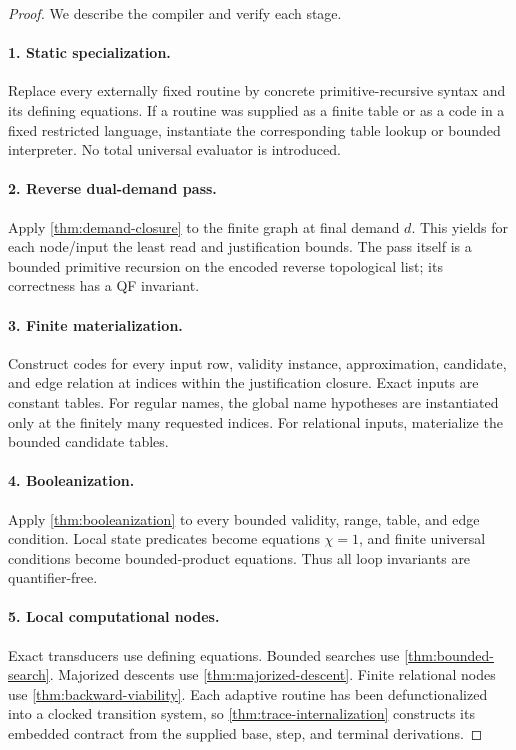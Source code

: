 \begin{proof}
We describe the compiler and verify each stage.

\paragraph{1. Static specialization.}
Replace every externally fixed routine by concrete primitive-recursive syntax and its
defining equations.  If a routine was supplied as a finite table or as a code in a
fixed restricted language, instantiate the corresponding table lookup or bounded
interpreter.  No total universal evaluator is introduced.

\paragraph{2. Reverse dual-demand pass.}
Apply \cref{thm:demand-closure} to the finite graph at final demand \(d\).  This yields
for each node/input the least read and justification bounds.  The pass itself is a
bounded primitive recursion on the encoded reverse topological list; its correctness
has a QF invariant.

\paragraph{3. Finite materialization.}
Construct codes for every input row, validity instance, approximation, candidate, and
edge relation at indices within the justification closure.  Exact inputs are constant
tables.  For regular names, the global name hypotheses are instantiated only at the
finitely many requested indices.  For relational inputs, materialize the bounded
candidate tables.

\paragraph{4. Booleanization.}
Apply \cref{thm:booleanization} to every bounded validity, range, table, and edge
condition.  Local state predicates become equations \(\chi=1\), and finite universal
conditions become bounded-product equations.  Thus all loop invariants are
quantifier-free.

\paragraph{5. Local computational nodes.}
Exact transducers use defining equations.  Bounded searches use
\cref{thm:bounded-search}.  Majorized descents use
\cref{thm:majorized-descent}.  Finite relational nodes use
\cref{thm:backward-viability}.  Each adaptive routine has been defunctionalized into a
clocked transition system, so \cref{thm:trace-internalization} constructs its embedded
contract from the supplied base, step, and terminal derivations.


\end{proof}
